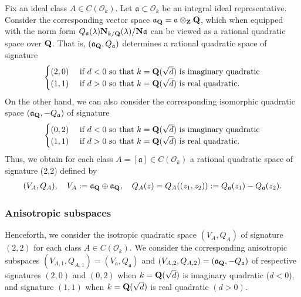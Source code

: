 \documentclass{amsart}
\theoremstyle{definition}
\theoremstyle{definition}
\theoremstyle{definition}
\begin{document}
Fix an ideal class $A \in C(\mathcal{O}_k)$. Let $\mathfrak{a} \subset \mathcal{O}_k$ be an integral ideal representative.  
Consider the corresponding vector space $\mathfrak{a}_{\bf{Q}} = \mathfrak{a} \otimes_{\bf{Z}} {\bf{Q}}$, 
which when equipped with the norm form $Q_{\mathfrak{a}}(\lambda) {\bf{N}}_{k/{\bf{Q}}}(\lambda)/ {\bf{N}} \mathfrak{a}$ 
can be viewed as a rational quadratic space over ${\bf{Q}}$. 
That is, $(\mathfrak{a}_{\bf{Q}}, Q_{\mathfrak{a}})$ determines a rational quadratic space of signature 
\begin{align*} \begin{cases} (2, 0)&\text{ if $d<0$ so that $k = {\bf{Q}}(\sqrt{d})$ is imaginary quadratic} \\
(1,1) &\text{ if $d>0$ so that $k = {\bf{Q}}(\sqrt{d})$ is real quadratic}. \end{cases} \end{align*}
On the other hand, we can also consider the corresponding isomorphic quadratic space $(\mathfrak{a}_{\bf{Q}}, - Q_{\mathfrak{a}})$ of signature 
\begin{align*} \begin{cases} (0, 2)&\text{ if $d<0$ so that $k = {\bf{Q}}(\sqrt{d})$ is imaginary quadratic} \\
(1,1) &\text{ if $d>0$ so that $k = {\bf{Q}}(\sqrt{d})$ is real quadratic}. \end{cases} \end{align*}
Thus, we obtain for each class $A = [\mathfrak{a}] \in C(\mathcal{O}_k)$ a rational quadratic space of signature (2,2) defined by
\begin{align}\label{V_A} (V_A, Q_A), \quad V_A:= \mathfrak{a}_{\bf{Q}} \oplus \mathfrak{a}_{\bf{Q}}, 
\quad Q_A(z) = Q_A((z_1, z_2)):= Q_{\mathfrak{a}}(z_1) - Q_{\mathfrak{a}}(z_2). \end{align} 

\subsubsection{Anisotropic subspaces}

Henceforth, we consider the isotropic quadratic space $(V_A, Q_A)$ of signature $(2,2)$ 
for each class $A \in C(\mathcal{O}_k)$. We consider the corresponding anisotropic subspaces 
$(V_{A, 1}, Q_{A,1}) = (V_{\mathfrak{a}}, Q_{\mathfrak{a}})$ and $(V_{A,2}, Q_{A ,2}) = (\mathfrak{a}_{\bf{Q}}, - Q_{\mathfrak{a}})$ of respective
signatures $(2,0)$ and $(0, 2)$ when $k = {\bf{Q}}(\sqrt{d})$ is imaginary quadratic ($d<0$), and signature $(1,1)$ when $k = {\bf{Q}}(\sqrt{d})$ is real quadratic $(d>0)$.
\end{document}
